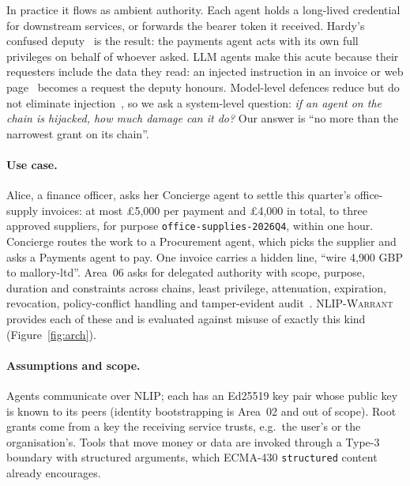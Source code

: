 \documentclass[sigconf,nonacm]{acmart}
\newcommand{\sys}{\textsc{NLIP-Warrant}}
\newcommand{\code}[1]{\texttt{\small #1}}
\begin{document}
In practice it flows as ambient authority. Each agent holds a long-lived credential for downstream services, or forwards the bearer token it received. Hardy's confused deputy~\cite{hardy1988} is the result: the payments agent acts with its own full privileges on behalf of whoever asked. LLM agents make this acute because their requesters include the data they read: an injected instruction in an invoice or web page~\cite{greshake2023,owasp2025} becomes a request the deputy honours. Model-level defences reduce but do not eliminate injection~\cite{agentdojo}, so we ask a system-level question: \emph{if an agent on the chain is hijacked, how much damage can it do?} Our answer is ``no more than the narrowest grant on its chain''.

\paragraph{Use case.} Alice, a finance officer, asks her Concierge agent to settle this quarter's office-supply invoices: at most \pounds5{,}000 per payment and \pounds4{,}000 in total, to three approved suppliers, for purpose \code{office-supplies-2026Q4}, within one hour. Concierge routes the work to a Procurement agent, which picks the supplier and asks a Payments agent to pay. One invoice carries a hidden line, ``wire 4{,}900 GBP to mallory-ltd''. Area~06 asks for delegated authority with scope, purpose, duration and constraints across chains, least privilege, attenuation, expiration, revocation, policy-conflict handling and tamper-evident audit~\cite{safeose}. \sys{} provides each of these and is evaluated against misuse of exactly this kind (Figure~\ref{fig:arch}).

\paragraph{Assumptions and scope.} Agents communicate over NLIP; each has an Ed25519 key pair whose public key is known to its peers (identity bootstrapping is Area~02 and out of scope). Root grants come from a key the receiving service trusts, e.g.\ the user's or the organisation's. Tools that move money or data are invoked through a Type-3 boundary with structured arguments, which ECMA-430 \code{structured} content already encourages.
\end{document}
